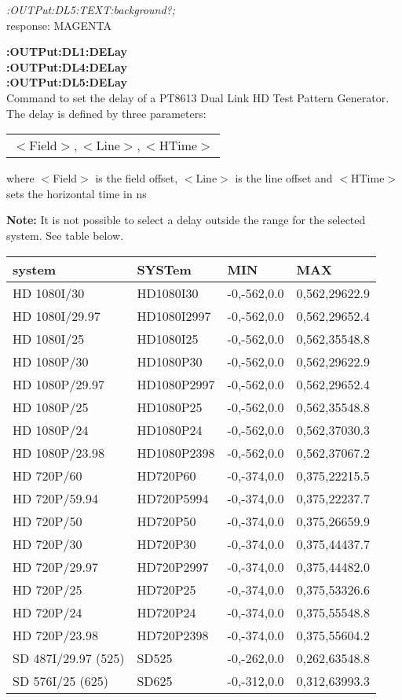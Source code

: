 \textit{:OUTPut:DL5:TEXT:background?;}\\ 
response: MAGENTA

\textbf{:OUTPut:DL1:DELay}\\
\textbf{:OUTPut:DL4:DELay}\\
\textbf{:OUTPut:DL5:DELay}\\

Command to set the delay of a PT8613 Dual Link HD Test Pattern Generator. The delay is defined by three parameters:

\begin{tabular}{l}
$<$Field$>,<$Line$>,<$HTime$>$
\end{tabular}

where $<$Field$>$ is the field offset, $<$Line$>$ is the line offset and $<$HTime$>$ sets the horizontal time in ns

\textbf{Note:} It is not possible to select a delay outside the range for the selected system.  See table below.

\begin{tabular}{l l l l}
system         &     SYSTem     &     MIN      &       MAX\\
\hline
HD 1080I/30        &  HD1080I30    & -0,-562,0.0 & 0,562,29622.9\\
HD 1080I/29.97     &  HD1080I2997  & -0,-562,0.0 & 0,562,29652.4\\
HD 1080I/25        &  HD1080I25    & -0,-562,0.0 & 0,562,35548.8\\
HD 1080P/30        &  HD1080P30    & -0,-562,0.0 & 0,562,29622.9\\
HD 1080P/29.97     &  HD1080P2997  & -0,-562,0.0 & 0,562,29652.4\\
HD 1080P/25        &  HD1080P25    & -0,-562,0.0 & 0,562,35548.8\\
HD 1080P/24        &  HD1080P24    & -0,-562,0.0 & 0,562,37030.3\\
HD 1080P/23.98     &  HD1080P2398  & -0,-562,0.0 & 0,562,37067.2\\
HD 720P/60         &  HD720P60     & -0,-374,0.0 & 0,375,22215.5\\
HD 720P/59.94      &  HD720P5994   & -0,-374,0.0 & 0,375,22237.7\\
HD 720P/50         &  HD720P50     & -0,-374,0.0 & 0,375,26659.9\\
HD 720P/30         &  HD720P30     & -0,-374,0.0 & 0,375,44437.7\\
HD 720P/29.97      &  HD720P2997   & -0,-374,0.0 & 0,375,44482.0\\
HD 720P/25         &  HD720P25     & -0,-374,0.0 & 0,375,53326.6\\
HD 720P/24         &  HD720P24     & -0,-374,0.0 & 0,375,55548.8\\
HD 720P/23.98      &  HD720P2398   & -0,-374,0.0 & 0,375,55604.2\\
SD 487I/29.97 (525)&  SD525        & -0,-262,0.0 & 0,262,63548.8\\
SD 576I/25 (625)   &  SD625        & -0,-312,0.0 & 0,312,63993.3\\
\end{tabular}

